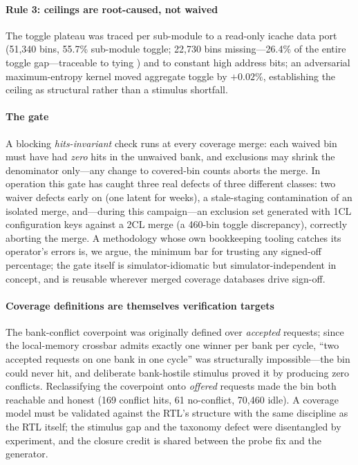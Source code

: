 \documentclass[review,12pt]{elsarticle}
\newcommand{\code}[1]{\texttt{\detokenize{#1}}}
\begin{document}
\paragraph{Rule 3: ceilings are root-caused, not waived} The toggle
plateau was traced per sub-module to a read-only icache data port
(51{,}340 bins, 55.7\% sub-module toggle; 22{,}730 bins
missing---26.4\% of the entire toggle gap---traceable to
\code{VX_socket.sv:106} tying \code{.WRITE_ENABLE(0)}) and to
constant high address bits; an adversarial maximum-entropy kernel
moved aggregate toggle by $+0.02\%$, establishing the ceiling as
structural rather than a stimulus shortfall.

\paragraph{The gate} A blocking \emph{hits-invariant} check runs at
every coverage merge: each waived bin must have had \emph{zero} hits
in the unwaived bank, and exclusions may shrink the denominator
only---any change to covered-bin counts aborts the merge. In
operation this gate has caught three real defects of three different
classes: two waiver defects early on (one latent for weeks), a
stale-staging contamination of an isolated merge, and---during this
campaign---an exclusion set generated with 1CL configuration keys
against a 2CL merge (a 460-bin toggle discrepancy), correctly
aborting the merge. A methodology whose own bookkeeping tooling
catches its operator's errors is, we argue, the minimum bar for
trusting any signed-off percentage; the gate itself is
simulator-idiomatic but simulator-independent in concept, and is
reusable wherever merged coverage databases drive sign-off.

\paragraph{Coverage definitions are themselves verification targets}
The bank-conflict coverpoint was originally defined over
\emph{accepted} requests; since the local-memory crossbar admits
exactly one winner per bank per cycle, ``two accepted requests on one
bank in one cycle'' was structurally impossible---the bin could never
hit, and deliberate bank-hostile stimulus proved it by producing
zero conflicts. Reclassifying the coverpoint onto \emph{offered}
requests made the bin both reachable and honest (169 conflict hits,
61 no-conflict, 70{,}460 idle). A coverage model must be validated
against the RTL's structure with the same discipline as the RTL
itself; the stimulus gap and the taxonomy defect were disentangled by
experiment, and the closure credit is shared between the probe fix
and the generator.
\end{document}
